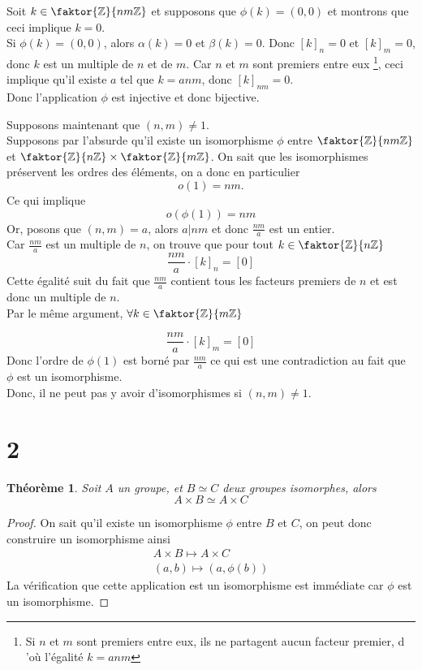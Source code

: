 \documentclass[11pt, a4paper, twoside]{article}
\newtheorem{thm}{Théorème}
\newcommand{\f}{\faktor}
\begin{document}
Soit $k\in \f { \mathbb{Z}} { nm\mathbb{Z}} $ et supposons que $\phi(  k ) =( 0,0) $ et montrons que ceci implique $ k =0$.\\
Si $\phi(  k ) = (0,0) $, alors $\alpha(  k ) = 0 $ et $\beta(  k )=0 $.
Donc $[k]_n = 0$ et $[k]_m= 0$, donc $k$ est un multiple de $n$ et de $m$.
Car $n$ et $m$ sont premiers entre eux \footnote{Si $n$ et $m$ sont premiers entre eux, ils ne partagent aucun facteur premier, d 'où l'égalité $k= anm$}, ceci implique qu'il existe $a$ tel que $k= anm$, donc $[ k ]_{nm} =0$.\\
Donc l'application $\phi$ est injective et donc bijective.

Supposons maintenant que $( n,m) \neq1$.\\
Supposons par l'absurde qu'il existe un isomorphisme $\phi$ entre $\f { \mathbb{Z}} { nm \mathbb{Z}} $ et $\f { \mathbb{Z}} { n\mathbb{Z}} \times\f { \mathbb{Z}} { m \mathbb{Z}} $.
On sait que les isomorphismes préservent les ordres des éléments, on a donc en particulier
\[ 
	o( 1) = nm.
\]
Ce qui implique
\[ 
	o(\phi( 1)) = nm
\]
Or, posons que $( n,m) = a$,  alors $a|nm$ et donc $\frac{nm}{a}$ est un entier.\\
Car $\frac{nm}{a}$ est un multiple de  $n$, on trouve que pour tout $k \in \f { \mathbb{Z}} { n\mathbb{Z}}$ 
\[ 
\frac{nm}{a} \cdot [ k ]_n = [ 0 ]
\]
Cette égalité suit du fait que $\frac{nm}{a}$ contient tous les facteurs premiers de $n$ et est donc un multiple de $n$.\\
Par le même argument, $\forall k \in\f { \mathbb{Z}} { m\mathbb{Z}} $

\[ 
\frac{nm}{a} \cdot [ k ]_m = [ 0 ]
\]
Donc l'ordre de $ \phi( 1) $ est borné par $\frac{nm}{a}$ ce qui est une contradiction au fait que $\phi$ est un isomorphisme.\\
Donc, il ne peut pas y avoir d'isomorphismes si $( n,m) \neq 1$.
\section*{2}
\begin{thm}
Soit $A$ un groupe, et $B\simeq C$ deux groupes isomorphes, alors
\[ 
A \times B \simeq A \times C
\]
\end{thm}
\begin{proof}
	On sait qu'il existe un isomorphisme $\phi$ entre $B$ et $C$, on peut donc construire un isomorphisme ainsi
	\begin{align*}
	A \times B \mapsto A \times C\\
	(a,b) \mapsto ( a, \phi( b) ) 
	\end{align*}
La vérification que cette application est un isomorphisme est immédiate car $\phi$ est un isomorphisme.
\end{proof}
	
\end{document}

